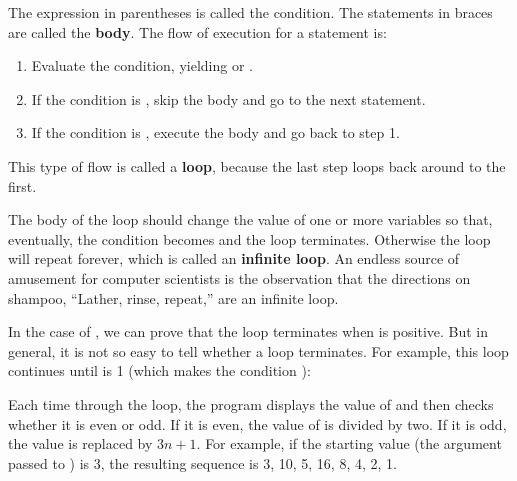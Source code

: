 
The expression in parentheses is called the condition.
The statements in braces are called the {\bf body}.
The flow of execution for a  statement is:

\begin{enumerate}

\item Evaluate the condition, yielding  or .

\item If the condition is , skip the body and go to the next statement.

\item If the condition is , execute the body and go back to step 1.

\end{enumerate}


This type of flow is called a {\bf loop}, because the last step loops back around to the first.


The body of the loop should change the value of one or more variables so that, eventually, the condition becomes  and the loop terminates.
Otherwise the loop will repeat forever, which is called an {\bf infinite loop}.
An endless source of amusement for computer scientists is the observation that the directions on shampoo, ``Lather, rinse, repeat,'' are an infinite loop.

In the case of , we can prove that the loop terminates when  is positive.
But in general, it is not so easy to tell whether a loop terminates.
For example, this loop continues until  is 1 (which makes the condition ):


Each time through the loop, the program displays the value of  and then checks whether it is even or odd.
If it is even, the value of  is divided by two.
If it is odd, the value is replaced by $3n+1$.
For example, if the starting value (the argument passed to ) is 3, the resulting sequence is 3, 10, 5, 16, 8, 4, 2, 1.


